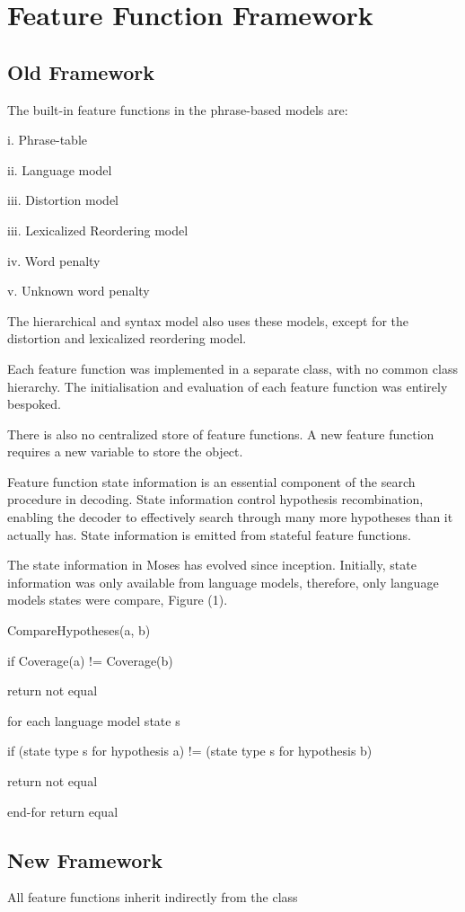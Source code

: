 \documentclass{pbml}
\begin{document}
\section{Feature Function Framework}
\subsection{Old Framework}
The built-in feature functions in the phrase-based models are:

i. Phrase-table

ii. Language model

iii. Distortion model

iii. Lexicalized Reordering model

    iv. Word penalty

    v. Unknown word penalty

The hierarchical and syntax model also uses these models, except for the distortion and lexicalized reordering model.

Each feature function was implemented in a separate class, with no common class hierarchy. The initialisation and evaluation of each feature function was entirely bespoked.

There is also no centralized store of feature functions. A new feature function requires a new variable to store the object.

Feature function state information is an essential component of the search procedure in decoding. State information control hypothesis recombination, enabling the decoder to effectively search through many more hypotheses than it actually has. State information is emitted from stateful feature functions.

The state information in Moses has evolved since inception. Initially, state information was only available from language models, therefore, only language models states were compare, Figure (1).

    CompareHypotheses(a, b)

       if Coverage(a) != Coverage(b)

         return not equal

        for each language model state s

          if (state type s for hypothesis a) != (state type s for hypothesis b)

             return not equal

        end-for
        return equal

\subsection{New Framework}        
 All feature functions inherit indirectly from the class
\end{document}
